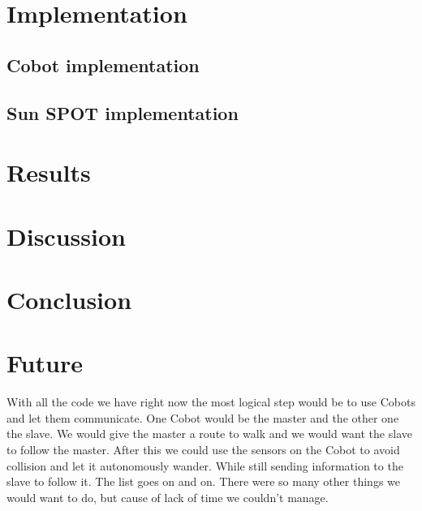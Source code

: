 \documentclass[a4paper,10pt]{article} %
\begin{document}



\section{Implementation} %
\label{sec:Implementation}


\subsection{Cobot implementation} %
\label{sub:Cobot implementation}


\subsection{Sun SPOT implementation} %
\label{sub:Sun SPOT implementation}



\section{Results} %
\label{sec:Results}


\section{Discussion} %


\section{Conclusion} %


\section{Future} %
\label{sec:future}

With all the code we have right now the most logical step would be to use Cobots
and let them communicate. One Cobot would be the master and the other one the
slave. We would give the master a route to walk and we would want the slave to
follow the master. After this we could use the sensors on the Cobot to avoid
collision and let it autonomously wander. While still sending information to the
slave to follow it. The list goes on and on. There were so many other things we
would want to do, but cause of lack of time we couldn't manage.
\end{document}
